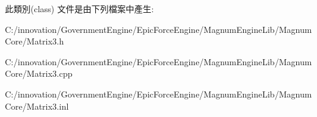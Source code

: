 此類別(class) 文件是由下列檔案中產生\+:\begin{DoxyCompactItemize}
\item 
C\+:/innovation/\+Government\+Engine/\+Epic\+Force\+Engine/\+Magnum\+Engine\+Lib/\+Magnum\+Core/Matrix3.\+h\item 
C\+:/innovation/\+Government\+Engine/\+Epic\+Force\+Engine/\+Magnum\+Engine\+Lib/\+Magnum\+Core/Matrix3.\+cpp\item 
C\+:/innovation/\+Government\+Engine/\+Epic\+Force\+Engine/\+Magnum\+Engine\+Lib/\+Magnum\+Core/Matrix3.\+inl\end{DoxyCompactItemize}
